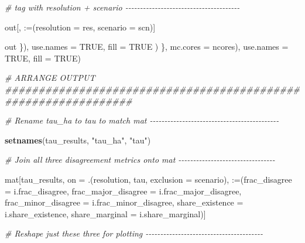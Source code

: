 \documentclass[
  11pt,
]{article}
\newenvironment{Shaded}{\begin{snugshade}}{\end{snugshade}}
\newcommand{\AttributeTok}[1]{\textcolor[rgb]{0.13,0.29,0.53}{#1}}
\newcommand{\CommentTok}[1]{\textcolor[rgb]{0.56,0.35,0.01}{\textit{#1}}}
\newcommand{\ConstantTok}[1]{\textcolor[rgb]{0.56,0.35,0.01}{#1}}
\newcommand{\FunctionTok}[1]{\textcolor[rgb]{0.13,0.29,0.53}{\textbf{#1}}}
\newcommand{\NormalTok}[1]{#1}
\newcommand{\OtherTok}[1]{\textcolor[rgb]{0.56,0.35,0.01}{#1}}
\newcommand{\StringTok}[1]{\textcolor[rgb]{0.31,0.60,0.02}{#1}}
\begin{document}
\begin{Shaded}
\begin{Highlighting}[]
        \CommentTok{\# tag with resolution + scenario {-}{-}{-}{-}{-}{-}{-}{-}{-}{-}{-}{-}{-}{-}{-}{-}{-}{-}{-}{-}{-}{-}{-}{-}{-}{-}{-}{-}{-}{-}{-}{-}{-}{-}{-}{-}{-}{-}{-}}

\NormalTok{        out[, }\StringTok{\textasciigrave{}}\AttributeTok{:=}\StringTok{\textasciigrave{}}\NormalTok{(}\AttributeTok{resolution =}\NormalTok{ res, }\AttributeTok{scenario =}\NormalTok{ scn)]}

\NormalTok{        out}
\NormalTok{      \}),}
      \AttributeTok{use.names =} \ConstantTok{TRUE}\NormalTok{, }\AttributeTok{fill =} \ConstantTok{TRUE}
\NormalTok{    )}
\NormalTok{  \}, }\AttributeTok{mc.cores =}\NormalTok{ ncores),}
  \AttributeTok{use.names =} \ConstantTok{TRUE}\NormalTok{, }\AttributeTok{fill =} \ConstantTok{TRUE}\NormalTok{)}

\CommentTok{\# ARRANGE OUTPUT \#\#\#\#\#\#\#\#\#\#\#\#\#\#\#\#\#\#\#\#\#\#\#\#\#\#\#\#\#\#\#\#\#\#\#\#\#\#\#\#\#\#\#\#\#\#\#\#\#\#\#\#\#\#\#\#\#\#\#\#\#\#\#}

\CommentTok{\# Rename tau\_ha to tau to match mat {-}{-}{-}{-}{-}{-}{-}{-}{-}{-}{-}{-}{-}{-}{-}{-}{-}{-}{-}{-}{-}{-}{-}{-}{-}{-}{-}{-}{-}{-}{-}{-}{-}{-}{-}{-}{-}{-}{-}{-}{-}{-}{-}{-}}

\FunctionTok{setnames}\NormalTok{(tau\_results, }\StringTok{"tau\_ha"}\NormalTok{, }\StringTok{"tau"}\NormalTok{)}

\CommentTok{\# Join all three disagreement metrics onto mat {-}{-}{-}{-}{-}{-}{-}{-}{-}{-}{-}{-}{-}{-}{-}{-}{-}{-}{-}{-}{-}{-}{-}{-}{-}{-}{-}{-}{-}{-}{-}{-}{-}}

\NormalTok{mat[tau\_results, on }\OtherTok{=}\NormalTok{ .(resolution, tau, }\AttributeTok{exclusion =}\NormalTok{ scenario),}
    \StringTok{\textasciigrave{}}\AttributeTok{:=}\StringTok{\textasciigrave{}}\NormalTok{(}\AttributeTok{frac\_disagree =}\NormalTok{ i.frac\_disagree,}
         \AttributeTok{frac\_major\_disagree =}\NormalTok{ i.frac\_major\_disagree,}
         \AttributeTok{frac\_minor\_disagree =}\NormalTok{ i.frac\_minor\_disagree,}
         \AttributeTok{share\_existence =}\NormalTok{ i.share\_existence,}
         \AttributeTok{share\_marginal =}\NormalTok{ i.share\_marginal)]}

\CommentTok{\# Reshape just these three for plotting {-}{-}{-}{-}{-}{-}{-}{-}{-}{-}{-}{-}{-}{-}{-}{-}{-}{-}{-}{-}{-}{-}{-}{-}{-}{-}{-}{-}{-}{-}{-}{-}{-}{-}{-}{-}{-}{-}{-}{-}}


\end{Highlighting}
\end{Shaded}
\end{document}
